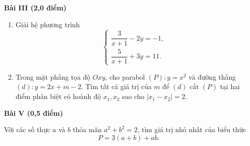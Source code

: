 \documentclass[12pt,a4paper]{article}
\begin{document}
\textbf{Bài III (2,0 điểm)}

\begin{enumerate}[label=\arabic*)]
  \item Giải hệ phương trình
  \[
  \begin{cases}
  \dfrac{3}{x+1}-2y=-1,\\[4pt]
  \dfrac{5}{x+1}+3y=11.
  \end{cases}
  \]
  \item Trong mặt phẳng tọa độ $Oxy$, cho parabol $(P): y=x^2$ và đường thẳng $(d): y=2x+m-2$. Tìm tất cả giá trị của $m$ để $(d)$ cắt $(P)$ tại hai điểm phân biệt có hoành độ $x_1,x_2$ sao cho $|x_1-x_2|=2$.
\end{enumerate}

\textbf{Bài V (0,5 điểm)}

Với các số thực $a$ và $b$ thỏa mãn $a^2+b^2=2$, tìm giá trị nhỏ nhất của biểu thức
\[
P=3(a+b)+ab.
\]
\end{document}
